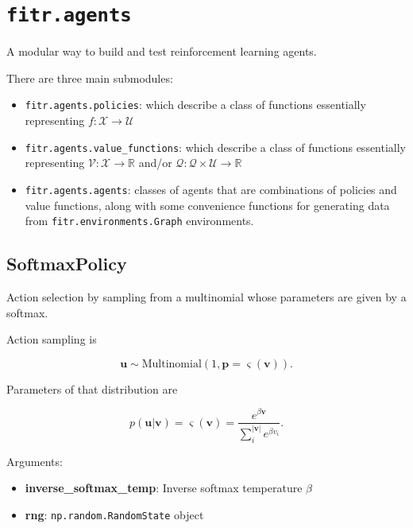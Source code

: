 \hypertarget{fitr.agents}{%
\section{\texorpdfstring{\texttt{fitr.agents}}{fitr.agents}}\label{fitr.agents}}

A modular way to build and test reinforcement learning agents.

There are three main submodules:

\begin{itemize}
\tightlist
\item
  \texttt{fitr.agents.policies}: which describe a class of functions
  essentially representing \(f:\mathcal X \to \mathcal U\)
\item
  \texttt{fitr.agents.value\_functions}: which describe a class of
  functions essentially representing
  \(\mathcal V: \mathcal X \to \mathbb R\) and/or
  \(\mathcal Q: \mathcal Q \times \mathcal U \to \mathbb R\)
\item
  \texttt{fitr.agents.agents}: classes of agents that are combinations
  of policies and value functions, along with some convenience functions
  for generating data from \texttt{fitr.environments.Graph}
  environments.
\end{itemize}

\hypertarget{softmaxpolicy}{%
\subsection{SoftmaxPolicy}\label{softmaxpolicy}}

\begin{Shaded}
\begin{Highlighting}[]
\end{Highlighting}
\end{Shaded}

Action selection by sampling from a multinomial whose parameters are
given by a softmax.

Action sampling is

\[
\mathbf u \sim \mathrm{Multinomial}(1, \mathbf p=\varsigma(\mathbf v)).
\]

Parameters of that distribution are

\[
p(\mathbf u|\mathbf v) = \varsigma(\mathbf v) = \frac{e^{\beta \mathbf v}}{\sum_{i}^{|\mathbf v|} e^{\beta v_i}}.
\]

Arguments:

\begin{itemize}
\tightlist
\item
  \textbf{inverse\_softmax\_temp}: Inverse softmax temperature \(\beta\)
\item
  \textbf{rng}: \texttt{np.random.RandomState} object
\end{itemize}

